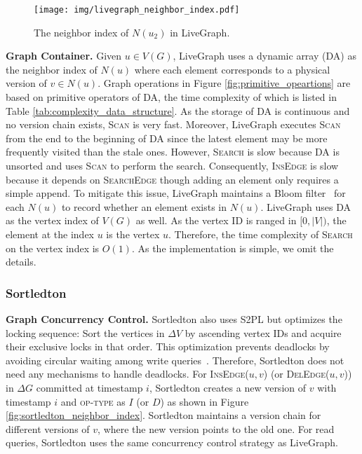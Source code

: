 \begin{figure}[h]\small
    \setlength{\abovecaptionskip}{3pt}
    \setlength{\belowcaptionskip}{0pt}
    \texttt{[image: img/livegraph\_neighbor\_index.pdf]}
    \centering
    \caption{The neighbor index of $N(u_2)$ in LiveGraph.}
    \label{fig:livegraph_index}
\end{figure}

\noindent\textbf{Graph Container.} Given $u \in V(G)$, LiveGraph uses a dynamic array (DA) as the neighbor index of $N(u)$ where each element corresponds to a physical version of $v \in N(u)$. Graph operations in Figure \ref{fig:primitive_opeartions} are based on primitive operators of DA, the time complexity of which is listed in Table \ref{tab:complexity_data_structure}. As the storage of DA is continuous and no version chain exists, \textsc{Scan} is very fast. Moreover, LiveGraph executes \textsc{Scan} from the end to the beginning of DA since the latest element may be more frequently visited than the stale ones. However, \textsc{Search} is slow because DA is unsorted and uses \textsc{Scan} to perform the search. Consequently, \textsc{InsEdge} is slow because it depends on \textsc{SearchEdge} though adding an element only requires a simple append. To mitigate this issue, LiveGraph maintains a Bloom filter~\cite{mitzenmacher2001compressed} for each $N(u)$ to record whether an element exists in $N(u)$. LiveGraph uses DA as the vertex index of $V(G)$ as well. As the vertex ID is ranged in $[0, |V|)$, the element at the index $u$ is the vertex $u$. Therefore, the time complexity of \textsc{Search} on the vertex index is $O(1)$. As the implementation is simple, we omit the details.

\subsubsection{\textbf{Sortledton}~\cite{fuchs2022sortledton}}

\textbf{Graph Concurrency Control.} Sortledton also uses S2PL but optimizes the locking sequence: Sort the vertices in $\Delta V$ by ascending vertex IDs and acquire their exclusive locks in that order. This optimization prevents deadlocks by avoiding circular waiting among write queries~\cite{silberschatz1991operating}. Therefore, Sortledton does not need any mechanisms to handle deadlocks. For \textsc{InsEdge($u, v$)} (or \textsc{DelEdge($u, v$)}) in $\Delta G$ committed at timestamp $i$, Sortledton creates a new version of $v$ with timestamp $i$ and \textsc{op-type} as $I$ (or $D$) as shown in Figure \ref{fig:sortledton_neighbor_index}. Sortledton maintains a version chain for different versions of $v$, where the new version points to the old one. For read queries, Sortledton uses the same concurrency control strategy as LiveGraph.


